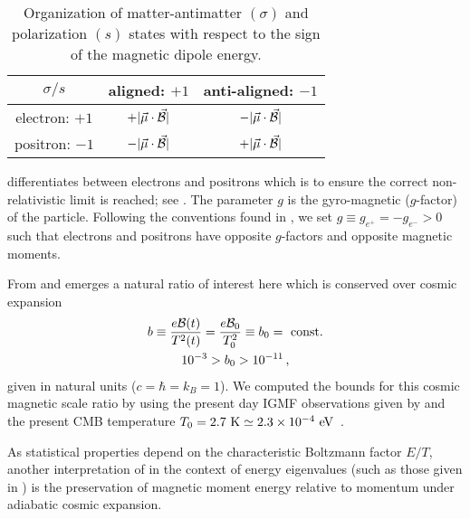 \begin{table}
    \centering
    \begin{tabular}{|c||c|c|} 
        \hline
        $\sigma/s$ & aligned: $+1$ & anti-aligned: $-1$ \\ 
        \hline\hline
        electron: $+1$ & $+|\vec{\mu}\cdot\vec{\cal B}|$ & $-|\vec{\mu}\cdot\vec{\cal B}|$ \\ 
        \hline
        positron: $-1$ & $-|\vec{\mu}\cdot\vec{\cal B}|$ & $+|\vec{\mu}\cdot\vec{\cal B}|$ \\
        \hline
    \end{tabular}
    \caption{Organization of matter-antimatter $(\sigma)$ and polarization $(s)$ states with respect to the sign of the magnetic dipole energy.}
    \label{tab:1}
\end{table}

 differentiates between electrons and positrons which is to ensure the correct non-relativistic limit is reached; see . The parameter $g$ is the gyro-magnetic ($g$-factor) of the particle. Following the conventions found in \cite{Tiesinga:2021myr}, we set $g\equiv g_{e^{+}}=-g_{e^{-}}>0$ such that electrons and positrons have opposite $g$-factors and opposite magnetic moments.

From  and  emerges a natural ratio of interest here which is conserved over cosmic expansion 
\begin{gather}
 \label{tbscale}
 b \equiv\frac{e{\cal B}(t)}{T^{2}(t)}=\frac{e{\cal B}_{0}}{T_{0}^{2}}\equiv b_0={\rm\ const.}\\
 10^{-3}>b_{0}>10^{-11}\,,
\end{gather}
given in natural units ($c=\hbar=k_{B}=1$). We computed the bounds for this cosmic magnetic scale ratio by using the present day IGMF observations given by  and the present CMB temperature $T_{0}=2.7{\rm\ K}\simeq2.3\times10^{-4}\eV$~\citep{Planck:2018vyg}.

As statistical properties depend on the characteristic Boltzmann factor $E/T$, another interpretation of  in the context of energy eigenvalues (such as those given in ) is the preservation of magnetic moment energy relative to momentum under adiabatic cosmic expansion.

